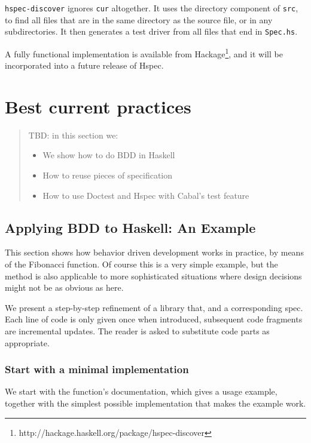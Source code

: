\documentclass[preprint]{sigplanconf}
\begin{document}
\verb|hspec-discover| ignores {\tt cur} altogether.  It uses the
directory component of {\tt src}, to find all files that are in the
same directory as the source file, or in any subdirectories.  It then generates
a test driver from all files that end in {\tt Spec.hs}.

A fully functional implementation is available from
Hackage\footnote{http://hackage.haskell.org/package/hspec-discover},
and it will be incorporated into a future release of Hspec.

\section{Best current practices}
\label{sec:best-current-practice}

\begin{quote}
    TBD: in this section we:
    \begin{itemize}
        \item We show how to do BDD in Haskell
        \item How to reuse pieces of specification
        \item How to use Doctest and Hspec with Cabal's test feature
    \end{itemize}
\end{quote}

\subsection{Applying BDD to Haskell: An Example}
This section shows how behavior driven development works in practice,
by means of the Fibonacci function.  Of course this is a very simple
example, but the method is also applicable to more sophisticated
situations where design decisions might not be as obvious as here.

We present a step-by-step refinement of a library
that, and a corresponding spec.  Each line of code is
only given once when introduced, subsequent code fragments are
incremental updates.  The reader is asked to substitute code parts as
appropriate.

\subsubsection{Start with a minimal implementation}

We start with the function's documentation, which gives a usage
example, together with the simplest possible implementation that makes
the example work.
\end{document}
